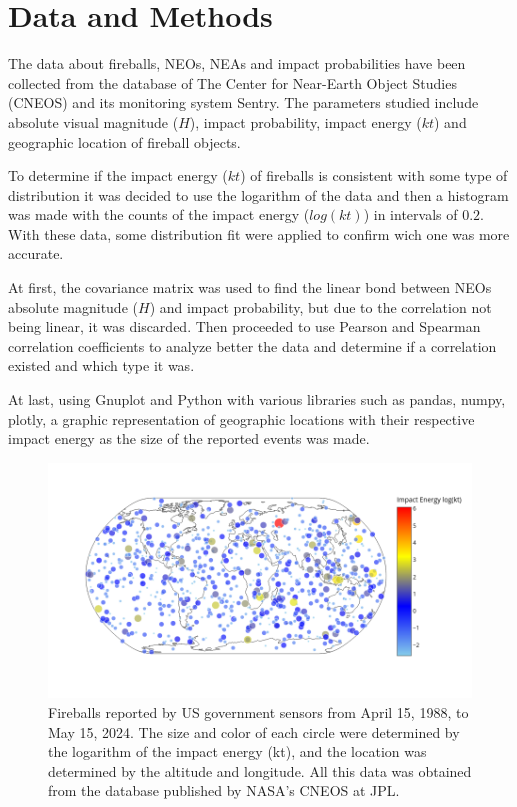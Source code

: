 \documentclass[
	a4paper, %
	10pt, %
	unnumberedsections, %
	twoside, %
]{LTJournalArticle}
\begin{document}
\section{Data and Methods}

The data about fireballs, NEOs, NEAs and impact probabilities have been collected from the database of
The Center for Near-Earth Object Studies (CNEOS) and its monitoring system Sentry. The parameters
studied include absolute visual magnitude ($H$), impact probability, impact energy ($kt$) and
geographic location of fireball objects.


To determine if the impact energy ($kt$) of fireballs is consistent with some type of distribution it
was decided to use the logarithm of the data and then a histogram was made with the counts of the
impact energy ($log(kt)$) in intervals of $0.2$. With these data, some distribution fit were applied
to confirm wich one was more accurate.

At first, the covariance matrix was used to find the linear bond between NEOs absolute magnitude ($H$)
and impact probability, but due to the correlation not being linear, it was discarded. Then proceeded
to use Pearson and Spearman correlation coefficients to analyze better the data and determine if a
correlation existed and which type it was.

At last, using Gnuplot and Python with various libraries such as pandas, numpy, plotly, a graphic
representation of geographic locations with their respective impact energy as the size of the reported
events was made.

\begin{figure} %
	\includegraphics[width=\linewidth]{fireballs.png}
	\caption{Fireballs reported by US government sensors from April 15, 1988, to May 15, 2024. The size and color of each circle were determined by the logarithm of the impact energy (kt), and the location was determined by the altitude and longitude. All this data was obtained from the database published by NASA’s CNEOS at JPL.}
	\label{fig:fireballs}
\end{figure}
\end{document}
